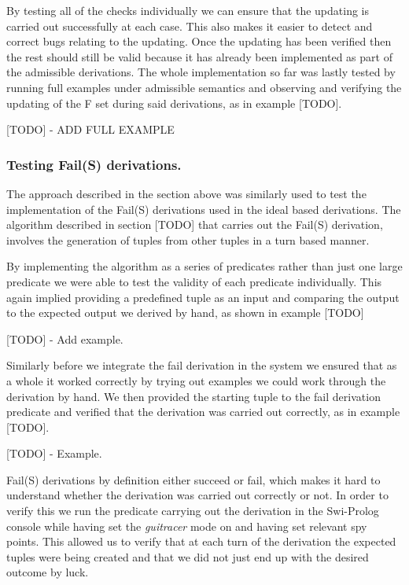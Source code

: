 By testing all of the checks individually we can ensure that the updating is carried out successfully at each case. This also makes it easier to detect and correct bugs relating to the updating. Once the updating has been verified then the rest should still be valid because it has already been implemented as part of the admissible derivations. The whole implementation so far was lastly tested by running full examples under admissible semantics and observing and verifying the updating of the F set during said derivations, as in example [TODO].

[TODO] - ADD FULL EXAMPLE

\subsubsection{Testing Fail(S) derivations.}
The approach described in the section above was similarly used to test the implementation of the Fail(S) derivations used in the ideal based derivations. The algorithm described in section [TODO] that carries out the Fail(S) derivation, involves the generation of tuples from other tuples in a turn based manner. 

By implementing the algorithm as a series of predicates rather than just one large predicate we were able to test the validity of each predicate individually. This again implied providing a predefined tuple as an input and comparing the output to the expected output we derived by hand, as shown in example [TODO]

[TODO] - Add example.

Similarly before we integrate the fail derivation in the system we ensured that as a whole it worked correctly by trying out examples we could work through the derivation by hand. We then provided the starting tuple to the fail derivation predicate and verified that the derivation was carried out correctly, as in example [TODO].

[TODO] - Example.

Fail(S) derivations by definition either succeed or fail, which makes it hard to understand whether the derivation was carried out correctly or not. In order to verify this we run the predicate carrying out the derivation in the Swi-Prolog console while having set the \emph{guitracer} mode on and having set relevant spy points. This allowed us to verify that at each turn of the derivation the expected tuples were being created and that we did not just end up with the desired outcome by luck.


